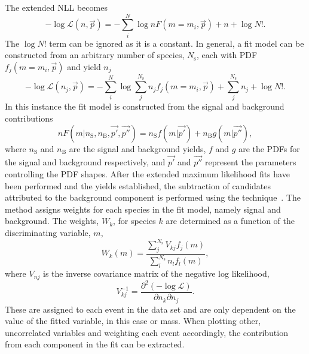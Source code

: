 The extended NLL becomes 
\begin{equation}
-\log\mathcal{L}(n,\vec{p}) = -\sum_{i}^{N} \log n F(m=m_{i},\vec{p}) + n + \log N!.
\end{equation}
The $\log N!$ term can be ignored as it is a constant.
In general, a fit model can be constructed from an arbitrary number of species, $N_{\text{s}}$, each with PDF $f_{j}(m=m_{i},\vec{p})$ and yield $n_{j}$   
\begin{equation}
-\log\mathcal{L}(n_{j},\vec{p}) = -\sum_{i}^{N} \log \sum^{N_{\text{s}}}_{j} n_{j} f_{j}(m=m_{i},\vec{p}) + \sum_{j}^{N_{\text{s}}}n_{j}  + \log N!.
\end{equation}
In this instance the fit model is constructed from the signal and background contributions 
\begin{equation}
n F(m| n_{\text{S}},n_{\text{B}},\vec{p'},\vec{p''}) = n_{\text{S}} f(m|\vec{p'}) + n_{\text{B}} g(m|\vec{p''}),
\end{equation}
where $n_{\text{S}}$ and $n_{\text{B}}$ are the signal and background yields, $f$ and $g$ are the PDFs for the signal and background respectively, and $\vec{p'}$ and $\vec{p''}$ represent the parameters controlling the PDF shapes.
After the extended maximum likelihood fits have been performed and the yields established, the subtraction of candidates attributed to the background component is performed using the \sPlot technique~\cite{Pivk:2004ty}.
The \sPlot method assigns weights for each species in the fit model, namely signal and background.  
The weights, $W_{k}$, for species $k$ are determined as a function of the discriminating variable, $m$,
\begin{equation}
W_{k}(m) = \frac{\sum_{j}^{N_{\text{s}}} V_{kj} f_{j}(m) }{ \sum_{l}^{N_{\text{s}}} n_{l} f_{l}(m)},
\end{equation}
where $V_{nj}$ is the inverse covariance matrix of the negative log likelihood,
\begin{equation}
V^{-1}_{kj} = \frac{  \partial^2 (-\log{\mathcal{L}} ) }{  \partial n_{k} \partial n_{j}}.
\end{equation}
These are assigned to each event in the data set and are only dependent on the value of the fitted variable, in this case \phiz or \Dsp mass. When plotting other, uncorrelated variables and weighting each event accordingly, the contribution from each component in the fit can be extracted.

